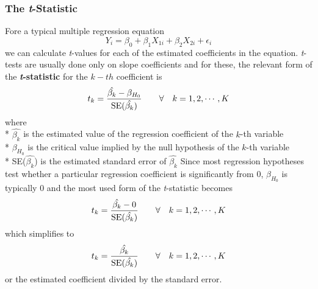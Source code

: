 \documentclass[11pt]{article}
\begin{document}
\subsubsection{The \textit{t}-Statistic}
Fore a typical multiple regression equation
\begin{equation}
Y_i = \beta_0 + \beta_1X_{1i} + \beta_2X_{2i} + \epsilon_i \label{eg5_1}
\end{equation}
we can calculate \textit{t}-values for each of the estimated coefficients in the equation. \textit{t}-tests are usually done only on slope coefficients and for these, the relevant form of the \textbf{\textit{t}-statistic} for the $k-th$ coefficient is
\begin{equation}
\label{eg5_2}
t_k = \frac{\hat{\beta_k}-\beta_{H_0}}{\text{SE}(\hat{\beta_k})}\quad \quad\forall \quad k=1, 2, \cdots, K \quad \\
\end{equation}
where \\*
$\hat{\beta_k}$ is the estimated value of the regression coefficient of the  $k$-th variable\\*
$\beta_{H_0}$ is the critical value implied by the null hypothesis of the $k$-th variable\\*
SE($\hat{\beta_k}$) is the estimated standard error of $\hat{\beta_k}$
Since most regression hypotheses test whether a particular regression coefficient is significantly from $0$, $\beta_{H_0}$ is typically $0$ and the most used form of the \textit{t}-statistic becomes
\begin{equation*}
t_k = \frac{\hat{\beta_k}-0}{\text{SE}(\hat{\beta_k})}\quad \quad\forall \quad k=1, 2, \cdots, K \quad \\
\end{equation*}
which simplifies to
\begin{equation}
\label{eg5_3}
t_k = \frac{\hat{\beta_k}}{\text{SE}(\hat{\beta_k})}\quad \quad\forall \quad k=1, 2, \cdots, K \quad \\
\end{equation}
or the estimated coefficient divided by the standard error.\\ \\
\end{document}
